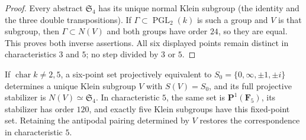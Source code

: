 \begin{proof}
Every abstract $\mathfrak S_4$ has its unique normal Klein subgroup (the identity and the three double transpositions). If $\Gamma\subset\operatorname{PGL}_2(k)$ is such a group and $V$ is that subgroup, then $\Gamma\subset N(V)$ and both groups have order $24$, so they are equal. This proves both inverse assertions. All six displayed points remain distinct in characteristics $3$ and $5$; no step divided by $3$ or $5$.
\end{proof}

\begin{theorem}\label{A5-six-points}
If $\operatorname{char}k\ne2,5$, a six-point set projectively equivalent to
$S_0=\{0,\infty,\pm1,\pm i\}$ determines a unique Klein subgroup $V$ with $S(V)=S_0$, and its full projective stabilizer is $N(V)\simeq\mathfrak S_4$.
In characteristic $5$, the same set is $\mathbf P^1(\mathbf F_5)$, its stabilizer has order $120$, and exactly five Klein subgroups have this fixed-point set. Retaining the antipodal pairing determined by $V$ restores the correspondence in characteristic $5$.
\end{theorem}

